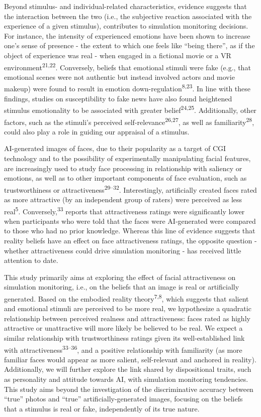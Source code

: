 \documentclass[
  man,floatsintext]{apa6}
\begin{document}
Beyond stimulus- and individual-related characteristics, evidence suggests that the interaction between the two (i.e., the subjective reaction associated with the experience of a given stimulus), contributes to simulation monitoring decisions. For instance, the intensity of experienced emotions have been shown to increase one's sense of presence - the extent to which one feels like ``being there'', as if the object of experience was real - when engaged in a fictional movie or a VR environment\textsuperscript{21,22}. Conversely, beliefs that emotional stimuli were fake (e.g., that emotional scenes were not authentic but instead involved actors and movie makeup) were found to result in emotion down-regulation\textsuperscript{8,23}. In line with these findings, studies on susceptibility to fake news have also found heightened stimulus emotionality to be associated with greater belief\textsuperscript{24,25}. Additionally, other factors, such as the stimuli's perceived self-relevance\textsuperscript{26,27}, as well as familiarity\textsuperscript{28}, could also play a role in guiding our appraisal of a stimulus.

AI-generated images of faces, due to their popularity as a target of CGI technology and to the possibility of experimentally manipulating facial features, are increasingly used to study face processing in relationship with saliency or emotions, as well as to other important components of face evaluation, such as trustworthiness or attractiveness\textsuperscript{29--32}. Interestingly, artificially created faces rated as more attractive (by an independent group of raters) were perceived as less real\textsuperscript{5}. Conversely,\textsuperscript{33} reports that attractiveness ratings were significantly lower when participants who were told that the faces were AI-generated were compared to those who had no prior knowledge. Whereas this line of evidence suggests that reality beliefs have an effect on face attractiveness ratings, the opposite question - whether attractiveness could drive simulation monitoring - has received little attention to date.

This study primarily aims at exploring the effect of facial attractiveness on simulation monitoring, i.e., on the beliefs that an image is real or artificially generated. Based on the embodied reality theory\textsuperscript{7,8},
which suggests that salient and emotional stimuli are perceived to be more real, we hypothesize a quadratic relationship between perceived realness and attractiveness: faces rated as highly attractive or unattractive will more likely be believed to be real. We expect a similar relationship with trustworthiness ratings given its well-established link with attractiveness\textsuperscript{33--36}, and a positive relationship with familiarity (as more familiar faces would appear as more salient, self-relevant and anchored in reality). Additionally, we will further explore the link shared by dispositional traits, such as personality and attitude towards AI, with simulation monitoring tendencies. This study aims beyond the investigation of the discriminative accuracy between ``true'' photos and ``true'' artificially-generated images, focusing on the beliefs that a stimulus is real or fake, independently of its true nature.
\end{document}
